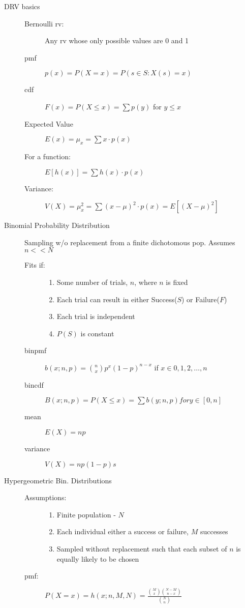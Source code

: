 \documentclass[12pt]{letter}
\begin{document}
\begin{multicols}{2}
\begin{description}
  \item[DRV basics]
    \begin{description}
    \item[Bernoulli rv:] Any rv whose only possible values are 0 and 1
    \item[pmf] $p(x) = P(X=x) = P(s \in S: X(s) = x)$
    \item[cdf] $F(x) = P(X \leq x) = \sum p(y) $ for $y \leq x$
    \item[Expected Value] $E(x) = \mu_x = \sum x \cdot p(x)$
    \item[For a function:] $E[h(x)] = \sum h(x) \cdot p(x)$
    \item[Variance:] $V(X) = \mu_x^2 = \sum (x - \mu)^2 \cdot p(x) = E[(X-\mu)^2]$
    \end{description}

  \item[Binomial Probability Distribution]
    Sampling w/o replacement from a finite dichotomous pop.
    Assumes $n << N$
      

    \begin{description}
    \item[Fits if:]
      \begin{enumerate}
      \item Some number of trials, $n$, where $n$ is fixed
      \item Each trial can result in either Success($S$) or Failure($F$)
      \item Each trial is independent
      \item $P(S)$ is constant
      \end{enumerate}
    \item[binpmf] $b(x; n,p) = {n \choose x} p^x (1 - p)^{n-x}$ if $x \in 0,1,2,\ldots,n$
    \item[bincdf] $B(x; n,p) = P(X \leq x) = \sum b(y; n,p) for y \in [0,n]$
    \item[mean] $E(X) = np$
    \item[variance] $V(X) = np(1-p)s$
    \end{description}

  \item[Hypergeometric Bin. Distributions]
    \begin{description}
    \item[Assumptions:]
      \begin{enumerate}
      \item Finite population - $N$
      \item Each individual either a success or failure, $M$ successes
      \item Sampled without replacement such that each subset of $n$ is equally likely to be chosen
      \end{enumerate}
    \item[pmf:] $P(X = x) = h(x; n,M,N) = \frac{{M \choose x} {N-M \choose n-x} }{ {N \choose n} }$
    

\end{description}
\end{description}
\end{multicols}
\end{document}
